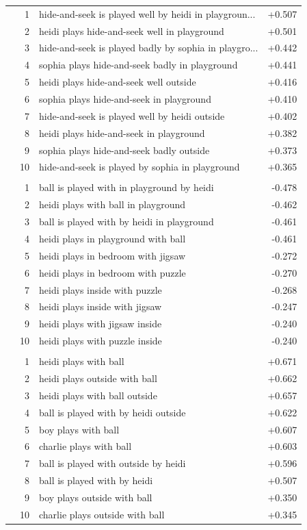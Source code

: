 \begin{longtable}{@{}lrlr@{}}
 & 1 & hide-and-seek is played well by heidi in playgroun... & +0.507 \\
 & 2 & heidi plays hide-and-seek well in playground & +0.501 \\
 & 3 & hide-and-seek is played badly by sophia in playgro... & +0.442 \\
 & 4 & sophia plays hide-and-seek badly in playground & +0.441 \\
 & 5 & heidi plays hide-and-seek well outside & +0.416 \\
 & 6 & sophia plays hide-and-seek in playground & +0.410 \\
 & 7 & hide-and-seek is played well by heidi outside & +0.402 \\
 & 8 & heidi plays hide-and-seek in playground & +0.382 \\
 & 9 & sophia plays hide-and-seek badly outside & +0.373 \\
 & 10 & hide-and-seek is played by sophia in playground & +0.365 \\
\addlinespace
\multicolumn{4}{l}{\textit{Basic Event -- Hardest}} \\
 & 1 & ball is played with in playground by heidi & -0.478 \\
 & 2 & heidi plays with ball in playground & -0.462 \\
 & 3 & ball is played with by heidi in playground & -0.461 \\
 & 4 & heidi plays in playground with ball & -0.461 \\
 & 5 & heidi plays in bedroom with jigsaw & -0.272 \\
 & 6 & heidi plays in bedroom with puzzle & -0.270 \\
 & 7 & heidi plays inside with puzzle & -0.268 \\
 & 8 & heidi plays inside with jigsaw & -0.247 \\
 & 9 & heidi plays with jigsaw inside & -0.240 \\
 & 10 & heidi plays with puzzle inside & -0.240 \\
\addlinespace[3pt]
\multicolumn{4}{l}{\textit{Basic Event -- Easiest}} \\
 & 1 & heidi plays with ball & +0.671 \\
 & 2 & heidi plays outside with ball & +0.662 \\
 & 3 & heidi plays with ball outside & +0.657 \\
 & 4 & ball is played with by heidi outside & +0.622 \\
 & 5 & boy plays with ball & +0.607 \\
 & 6 & charlie plays with ball & +0.603 \\
 & 7 & ball is played with outside by heidi & +0.596 \\
 & 8 & ball is played with by heidi & +0.507 \\
 & 9 & boy plays outside with ball & +0.350 \\
 & 10 & charlie plays outside with ball & +0.345 \\
\end{longtable}
\normalsize
